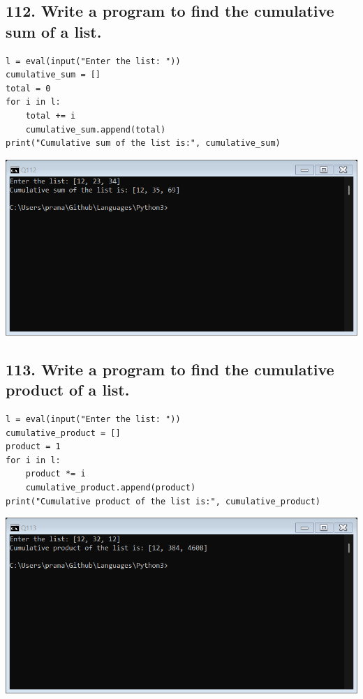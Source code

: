 \documentclass[12pt]{article}
\begin{document}
\subsection*{112. Write a program to find the cumulative sum of a list.}
\begin{verbatim}
l = eval(input("Enter the list: "))
cumulative_sum = []
total = 0
for i in l:
    total += i
    cumulative_sum.append(total)
print("Cumulative sum of the list is:", cumulative_sum)
\end{verbatim}
\includegraphics[width=\linewidth]{images/112.png}

\subsection*{113. Write a program to find the cumulative product of a list.}
\begin{verbatim}
l = eval(input("Enter the list: "))
cumulative_product = []
product = 1
for i in l:
    product *= i
    cumulative_product.append(product)
print("Cumulative product of the list is:", cumulative_product)
\end{verbatim}
\includegraphics[width=\linewidth]{images/113.png}
\end{document}
